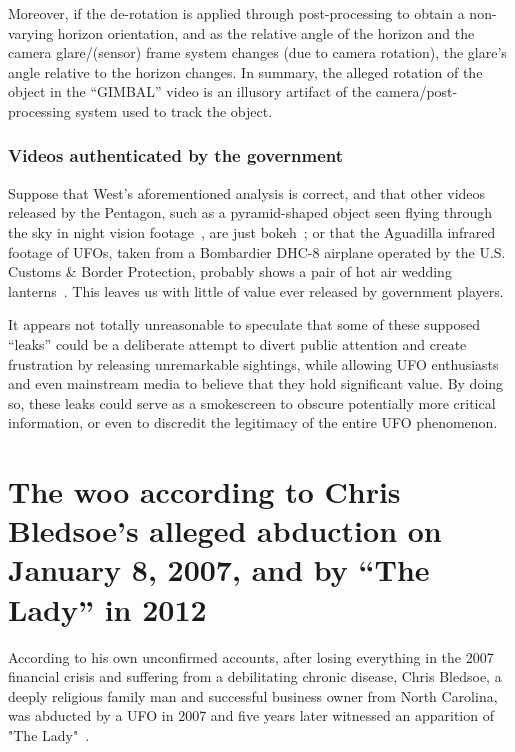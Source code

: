 Moreover, if the de-rotation is applied through post-processing to obtain a non-varying horizon orientation,
and as the relative angle of the horizon and the camera glare/(sensor) frame system changes (due to camera rotation), the glare's angle relative to the horizon changes.
In summary, the alleged rotation of the object in the ``GIMBAL'' video is an illusory artifact of the camera/post-processing system used to track the object.

\subsubsection*{Videos authenticated by the government}


Suppose that West's aforementioned analysis is correct,
and that other videos released by the Pentagon,
such as a pyramid-shaped object seen flying through the sky in night vision footage~\cite{Cnn2021Apr},
are just bokeh~\cite{West2023Mar};
or that the Aguadilla infrared footage of UFOs, taken from a Bombardier DHC-8 airplane operated by the
U.S. Customs \& Border Protection, probably shows a pair of hot air wedding lanterns~\cite{Lianza2023Apr}.
This leaves us with little of value ever released by government players.


It appears not totally unreasonable to speculate that some of these supposed ``leaks''
could be a deliberate attempt to divert public attention and create frustration
by releasing unremarkable sightings, while allowing UFO enthusiasts
and even mainstream media to believe that they hold significant value.
By doing so, these leaks could serve as a smokescreen to obscure potentially more critical information,
or even to discredit the legitimacy of the entire UFO phenomenon.







\section{The woo according to Chris Bledsoe's alleged abduction on January 8, 2007, and by ``The Lady'' in 2012}

According to his own unconfirmed accounts, after losing everything in the 2007 financial crisis and suffering from a debilitating chronic disease, Chris Bledsoe, a deeply religious family man and successful business owner from North Carolina, was abducted by a UFO in 2007 and five years later witnessed an apparition of "The Lady"~\cite{BledsoeChris}.

